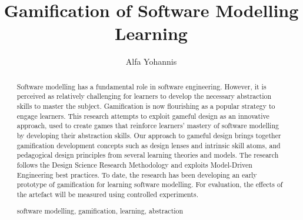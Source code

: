 \documentclass[runningheads,a4paper]{llncs}
\newcommand{\keywords}[1]{\par\addvspace\baselineskip
\noindent\keywordname\enspace\ignorespaces#1}
\begin{document}
\mainmatter %

\title{Gamification of Software Modelling Learning}


%
%
\author{Alfa Yohannis} %
%


%
%

\maketitle

\begin{abstract}
Software modelling has a fundamental role in software engineering. However, it is perceived as relatively challenging for learners to develop the necessary abstraction skills to master the subject. Gamification is now flourishing as a popular strategy to engage learners. This research attempts to exploit gameful design as an innovative approach, used to create games that reinforce learners' mastery of software modelling by developing their abstraction skills. Our approach to gameful design brings together gamification development concepts such as design lenses and intrinsic skill atoms, and pedagogical design principles from several learning theories and models. The research follows the Design Science Research Methodology and exploits Model-Driven Engineering best practices. To date, the research has been developing an early prototype of gamification for learning software modelling. For evaluation, the effects of the artefact will be measured using controlled experiments.
\keywords{software modelling, gamification, learning, abstraction}
\end{abstract}
\end{document}
